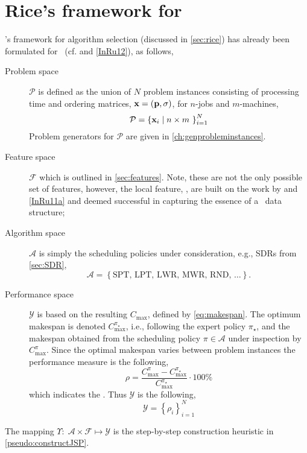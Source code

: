 \section{Rice's framework for \jsp}\label{sec:rice:jsp}
\citeauthor{Rice76}'s framework for algorithm selection (discussed in 
\cref{sec:rice}) has already been formulated for \jsp\ (cf. 
\citet{SmithMilesLion3,SmithMilesLion5} and \cref{InRu12}), as follows, 
\begin{description} 
	\item[Problem space] $\mathcal{P}$ is defined as the union of $N$ problem 
	instances consisting of processing time and ordering matrices, 
	$\mathbf{x}=(\mathbf{p},{\mathbf{\sigma}})$, for $n$-jobs and $m$-machines, 
	\begin{equation} 
		\mathcal{P}=\left\{\mathbf{x}_i\;\middle|\;n\times m~\right\}_{i=1}^{N}
	\end{equation}
	Problem generators for $\mathcal{P}$ are given in \cref{ch:genprobleminstances}.
	\item[Feature space] $\mathcal{F}$ which is outlined in 
	\cref{sec:features}. Note, these are not the only possible set of features, 
	however, the local feature, \phiLocalRelated, are built on the work by 
	\cite{SmithMilesLion3} and \cref{InRu11a} and deemed successful in 
	capturing the essence of a \jsp\ data structure;
	\item[Algorithm space] $\mathcal{A}$ is simply the scheduling policies under consideration, e.g., SDRs from \cref{sec:SDR},
	\begin{equation}
		\mathcal{A}=\left\{\text{SPT,~LPT,~LWR,~MWR,~RND,~}\dotsc\right\}.
	\end{equation} 
	\item[Performance space] $\mathcal{Y}$ is based on the resulting 
	$C_{\max}$, defined by \cref{eq:makespan}. The optimum makespan is denoted 
	$C_{\max}^{\pi_\star}$, i.e., following the expert policy $\pi_\star$, and 
	the makespan obtained from the scheduling policy $\pi\in\mathcal{A}$ under 
	inspection by $C_{\max}^{\pi}$. 
    Since the optimal makespan varies between problem instances the performance 
    measure is the following, 
	\begin{equation}\label{eq:rho}
		\rho=\frac{C_{\max}^{\pi}-C_{\max}^{\pi_\star}}{C_{\max}^{\pi_\star}}\cdot
		 100\%
	\end{equation}
	which indicates the \namerho. Thus $\mathcal{Y}$ is the following, 
	\begin{equation}
		\mathcal{Y}=\left\{\rho_i\right\}_{i=1}^{N}
	\end{equation}
\end{description}
The mapping $\Upsilon:\;\mathcal{A}\times\mathcal{F} \mapsto \mathcal{Y}$ is 
the step-by-step construction heuristic in \cref{pseudo:constructJSP}.